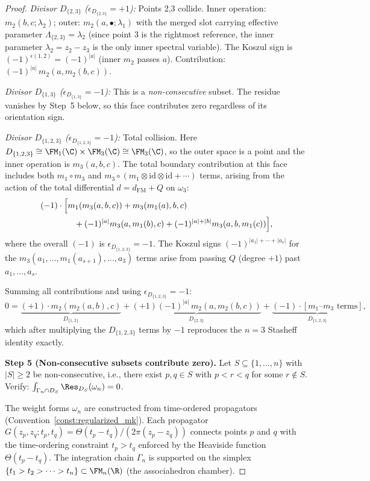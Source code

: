 \begin{proof}
\emph{Divisor $D_{\{2,3\}}$ ($\epsilon_{D_{\{2,3\}}} = +1$):}
Points 2,3 collide. Inner operation: $m_2(b,c;\lambda_2)$; outer: $m_2(a,\bullet;\lambda_1)$ with the merged slot carrying effective parameter $\Lambda_{\{2,3\}} = \lambda_2$ (since point 3 is the rightmost reference, the inner parameter $\lambda_2 = z_2 - z_3$ is the only inner spectral variable). The Koszul sign is $(-1)^{\epsilon(1,2)} = (-1)^{|a|}$ (inner $m_2$ passes $a$). Contribution: $(-1)^{|a|}\,m_2(a,m_2(b,c))$.

\emph{Divisor $D_{\{1,3\}}$ ($\epsilon_{D_{\{1,3\}}} = -1$):}
This is a \emph{non-consecutive} subset. The residue vanishes by Step~5 below, so this face contributes zero regardless of its orientation sign.

\emph{Divisor $D_{\{1,2,3\}}$ ($\epsilon_{D_{\{1,2,3\}}} = -1$):}
Total collision. Here $D_{\{1,2,3\}} \cong \FM_1(\C) \times \FM_3(\C) \cong \FM_3(\C)$, so the outer space is a point and the inner operation is $m_3(a,b,c)$. The total boundary contribution at this face includes both $m_1 \circ m_3$ and $m_3 \circ (m_1 \otimes \mathrm{id} \otimes \mathrm{id} + \cdots)$ terms, arising from the action of the total differential $d = d_{\mathrm{FM}} + Q$ on $\omega_3$:
\begin{align*}
&(-1) \cdot \Bigl[m_1(m_3(a,b,c)) + m_3(m_1(a),b,c) \\
&\qquad\qquad + (-1)^{|a|} m_3(a,m_1(b),c) + (-1)^{|a|+|b|} m_3(a,b,m_1(c))\Bigr],
\end{align*}
where the overall $(-1)$ is $\epsilon_{D_{\{1,2,3\}}} = -1$. The Koszul signs $(-1)^{|a_1|+\cdots+|a_s|}$ for the $m_3(a_1,\ldots,m_1(a_{s+1}),\ldots,a_3)$ terms arise from passing $Q$ (degree $+1$) past $a_1,\ldots,a_s$.

Summing all contributions and using $\epsilon_{D_{\{1,2,3\}}} = -1$:
\[
0 = \underbrace{(+1) \cdot m_2(m_2(a,b),c)}_{D_{\{1,2\}}}
+ \underbrace{(+1)(-1)^{|a|}\,m_2(a,m_2(b,c))}_{D_{\{2,3\}}}
+ \underbrace{(-1) \cdot [\text{$m_1$--$m_3$ terms}]}_{D_{\{1,2,3\}}},
\]
which after multiplying the $D_{\{1,2,3\}}$ terms by $-1$ reproduces the $n = 3$ Stasheff identity exactly.

\medskip
\textbf{Step 5 (Non-consecutive subsets contribute zero).}
Let $S \subseteq \{1,\ldots,n\}$ with $|S| \geq 2$ be non-consecutive, i.e., there exist $p, q \in S$ with $p < r < q$ for some $r \notin S$. Verify: $\int_{\Gamma_n \cap D_S} \Res_{D_S}(\omega_n) = 0$.

The weight forms $\omega_n$ are constructed from time-ordered propagators (Convention~\ref{const:regularized_mk}). Each propagator $G(z_p, z_q; t_p, t_q) = \Theta(t_p - t_q)/(2\pi(z_p - z_q))$ connects points $p$ and $q$ with the time-ordering constraint $t_p > t_q$ enforced by the Heaviside function $\Theta(t_p - t_q)$. The integration chain $\Gamma_n$ is supported on the simplex $\{t_1 > t_2 > \cdots > t_n\} \subset \FM_n(\R)$ (the associahedron chamber).


\end{proof}
